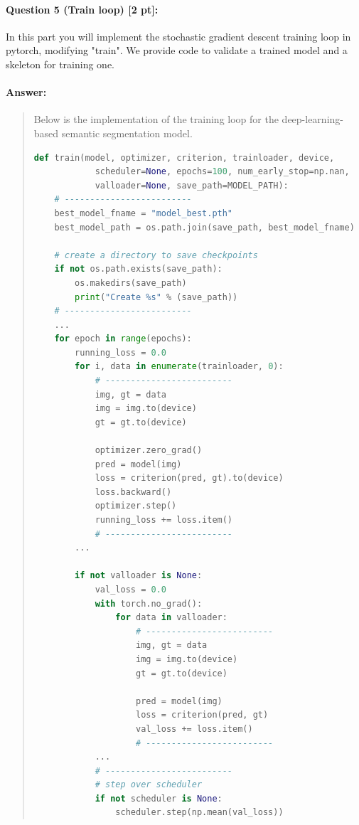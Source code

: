 \documentclass[11pt]{article}
\begin{document}
\paragraph{Question 5 (Train loop) [2 pt]:} 
In this part you will implement the stochastic gradient descent training loop in pytorch, modifying "train". We provide code to validate a trained model and a skeleton for training one. 
\paragraph{Answer:} 
\begin{quote}

Below is the implementation of the training loop for the deep-learning-based semantic segmentation model.

\begin{lstlisting}[language=Python, basicstyle=\scriptsize]
def train(model, optimizer, criterion, trainloader, device, 
            scheduler=None, epochs=100, num_early_stop=np.nan,
            valloader=None, save_path=MODEL_PATH):
    # -------------------------
    best_model_fname = "model_best.pth"
    best_model_path = os.path.join(save_path, best_model_fname)

    # create a directory to save checkpoints
    if not os.path.exists(save_path):
        os.makedirs(save_path)
        print("Create %s" % (save_path))
    # -------------------------
    ...
    for epoch in range(epochs):
        running_loss = 0.0
        for i, data in enumerate(trainloader, 0):
            # -------------------------
            img, gt = data
            img = img.to(device)
            gt = gt.to(device)
            
            optimizer.zero_grad()
            pred = model(img)
            loss = criterion(pred, gt).to(device)
            loss.backward()
            optimizer.step()
            running_loss += loss.item()
            # -------------------------
        ...

        if not valloader is None:
            val_loss = 0.0
            with torch.no_grad():
                for data in valloader:
                    # -------------------------
                    img, gt = data
                    img = img.to(device)
                    gt = gt.to(device)
                    
                    pred = model(img)
                    loss = criterion(pred, gt)
                    val_loss += loss.item()
                    # -------------------------
            ...
            # -------------------------
            # step over scheduler
            if not scheduler is None:
                scheduler.step(np.mean(val_loss))


\end{lstlisting}
\end{quote}
\end{document}

